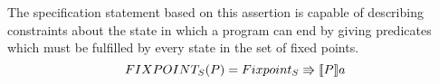 The specification statement based on this assertion is capable of describing constraints about the state in which a program can end by giving predicates which must be fulfilled by every state in the set of fixed points.
\begin{equation}
    FIXPOINT_S(P) = Fixpoint_S \Rrightarrow \llbracket P \rrbracket a
\end{equation}
\begin{code}
    \>[2]\AgdaSpace{}%
    \AgdaSymbol{:}\AgdaSpace{}%
    \AgdaSpace{}%
    \AgdaSpace{}%
    \AgdaSpace{}%
    \AgdaSpace{}%
    \<%
    \\
    \>[2]\AgdaSpace{}%
    \AgdaSpace{}%
    \AgdaSpace{}%
    \AgdaSymbol{=}\AgdaSpace{}%
    \AgdaSpace{}%
    \AgdaSpace{}%
    \AgdaSpace{}%
    \AgdaSpace{}%
    \AgdaSpace{}%
    \<%
    \\
    \\[\AgdaEmptyExtraSkip]%
    \>[2]\AgdaSpace{}%
    \AgdaSpace{}%
    \<%
    \\
    \>[2]\AgdaSpace{}%
    \AgdaSymbol{:}\AgdaSpace{}%
    \AgdaSpace{}%
    \AgdaSpace{}%
    \AgdaSpace{}%
    \AgdaSpace{}%
    \<%
    \\
    \>[2]\AgdaSpace{}%
    \AgdaOperator{\AgdaFunction{∈FP[}}\AgdaSpace{}%
    \AgdaSpace{}%
    \AgdaOperator{\AgdaFunction{]}}\AgdaSpace{}%
    \AgdaSymbol{=}\AgdaSpace{}%
    \AgdaSpace{}%
    \AgdaSpace{}%
    \<%
\end{code}

